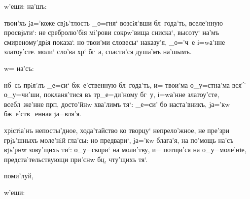  w'еши:     на'шъ:


 твои'хъ jа='коже свjь'тлость _о=гня` 
возсiя'вши бл~года'ть, вселе'нную просвjьти`: не 
сребролю'бiя мi'рови сокрw'вища сниска`, высоту` на'мъ 
смиреному'дрiя показа`. но твои'ми словесы` наказу'я, 
_о='ч~е i=wа'нне златоу'сте. моли` сло'ва хр` бг~а, 
спасти'ся душа'мъ на'шымъ.


  w= на'съ:

 нб~съ прiя'лъ _е=си` бж~е'ственную бл~года'ть, и= 
твои'ма о_у=стна'ма вся^ о_у=чи'ши, покланя'тися въ 
тр _е=ди'ному бг~у, i=wа'нне златоу'сте, 
всебл~же'нне прп, досто'йнw хва'лимъ тя`: _е=си' бо 
наста'вникъ, jа='кw бж~е'ств_енная jа=вля'я.


 хрiстiа'нъ непосты'дное, хода'тайство 
ко творцу` непрело'жное, не пре'зри грjь'шныхъ моле'нiй 
гла'сы: но предвари`, jа='кw блага'я, на по'мощь на'съ 
вjь'рнw зову'щихъ ти`: о_у=скори` на моли'тву, и= 
потщи'ся на о_у=моле'нiе, предста'тельствующи при'снw 
бц, чту'щихъ тя`.


 поми'луй,   

                                             w'еши: 


